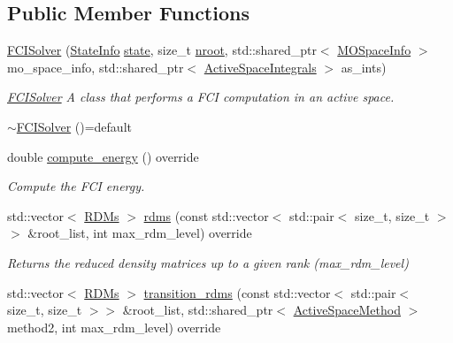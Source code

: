 \subsection*{Public Member Functions}
\begin{DoxyCompactItemize}
\item 
\mbox{\hyperlink{classforte_1_1_f_c_i_solver_a5037b1cfcc06a3709a33fa02c9d89d1b}{F\+C\+I\+Solver}} (\mbox{\hyperlink{classforte_1_1_state_info}{State\+Info}} \mbox{\hyperlink{classforte_1_1_active_space_method_a609f005cc7d3a1bc03ae517002eb19dc}{state}}, size\+\_\+t \mbox{\hyperlink{classforte_1_1_active_space_method_aa2bafc732bd7023fd32fbd263ef2e903}{nroot}}, std\+::shared\+\_\+ptr$<$ \mbox{\hyperlink{classforte_1_1_m_o_space_info}{M\+O\+Space\+Info}} $>$ mo\+\_\+space\+\_\+info, std\+::shared\+\_\+ptr$<$ \mbox{\hyperlink{classforte_1_1_active_space_integrals}{Active\+Space\+Integrals}} $>$ as\+\_\+ints)
\begin{DoxyCompactList}\small\item\em \mbox{\hyperlink{classforte_1_1_f_c_i_solver}{F\+C\+I\+Solver}} A class that performs a F\+CI computation in an active space. \end{DoxyCompactList}\item 
\mbox{\hyperlink{classforte_1_1_f_c_i_solver_a6491f1a5c2a79bf9ede2ab863815b8d4}{$\sim$\+F\+C\+I\+Solver}} ()=default
\item 
double \mbox{\hyperlink{classforte_1_1_f_c_i_solver_a5ea02e6826ffd8eb01fd25c229517159}{compute\+\_\+energy}} () override
\begin{DoxyCompactList}\small\item\em Compute the F\+CI energy. \end{DoxyCompactList}\item 
std\+::vector$<$ \mbox{\hyperlink{classforte_1_1_r_d_ms}{R\+D\+Ms}} $>$ \mbox{\hyperlink{classforte_1_1_f_c_i_solver_a40d53f62ae73a7baf7560dac37838b8b}{rdms}} (const std\+::vector$<$ std\+::pair$<$ size\+\_\+t, size\+\_\+t $>$$>$ \&root\+\_\+list, int max\+\_\+rdm\+\_\+level) override
\begin{DoxyCompactList}\small\item\em Returns the reduced density matrices up to a given rank (max\+\_\+rdm\+\_\+level) \end{DoxyCompactList}\item 
std\+::vector$<$ \mbox{\hyperlink{classforte_1_1_r_d_ms}{R\+D\+Ms}} $>$ \mbox{\hyperlink{classforte_1_1_f_c_i_solver_ad29797ad91b7edb6b3d8a4c66aaf18a0}{transition\+\_\+rdms}} (const std\+::vector$<$ std\+::pair$<$ size\+\_\+t, size\+\_\+t $>$$>$ \&root\+\_\+list, std\+::shared\+\_\+ptr$<$ \mbox{\hyperlink{classforte_1_1_active_space_method}{Active\+Space\+Method}} $>$ method2, int max\+\_\+rdm\+\_\+level) override

\end{DoxyCompactItemize}
